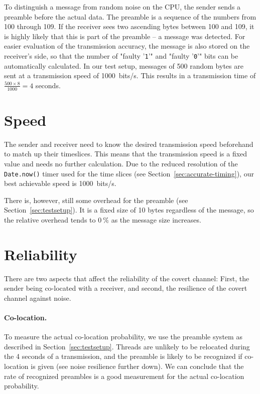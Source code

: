 \documentclass[11pt,
  titlepage=false,
  parskip=half,      %
]{scrreprt}
\begin{document}
To distinguish a message from random noise on the CPU, the sender sends a preamble before the actual data.
The preamble is a sequence of the numbers from 100 through 109.
If the receiver sees two ascending bytes between 100 and 109, it is highly likely that this is part of the preamble --
a message was detected.
For easier evaluation of the transmission accuracy, the message is also stored on the receiver's side,
so that the number of "faulty '\texttt{1}'" and "faulty '\texttt{0}'" bits can be automatically calculated.
In our test setup, messages of 500 random bytes are sent at a transmission speed of 1000~bits/s.
This results in a transmission time of $\frac{500 \times 8}{1000} = 4$ seconds.

\section{Speed}
The sender and receiver need to know the desired transmission speed beforehand to match up their timeslices.
This means that the transmission speed is a fixed value and needs no further calculation.
Due to the reduced resolution of the \texttt{Date.now()} timer used for the time slices (see Section~\ref{sec:accurate-timing}),
our best achievable speed is 1000~bits/s.

There is, however, still some overhead for the preamble (see Section~\ref{sec:testsetup}).
It is a fixed size of 10 bytes regardless of the message,
so the relative overhead tends to $0~\%$ as the message size increases.

\section{Reliability}
There are two aspects that affect the reliability of the covert channel:
First, the sender being co-located with a receiver, and second, the resilience of the covert channel against noise.

\paragraph{Co-location.}
To measure the actual co-location probability, we use the preamble system as described in Section~\ref{sec:testsetup}.
Threads are unlikely to be relocated during the 4 seconds of a transmission,
and the preamble is likely to be recognized if co-location is given (see noise resilience further down).
We can conclude that the rate of recognized preambles is a good measurement for the actual co-location probability.
\end{document}
